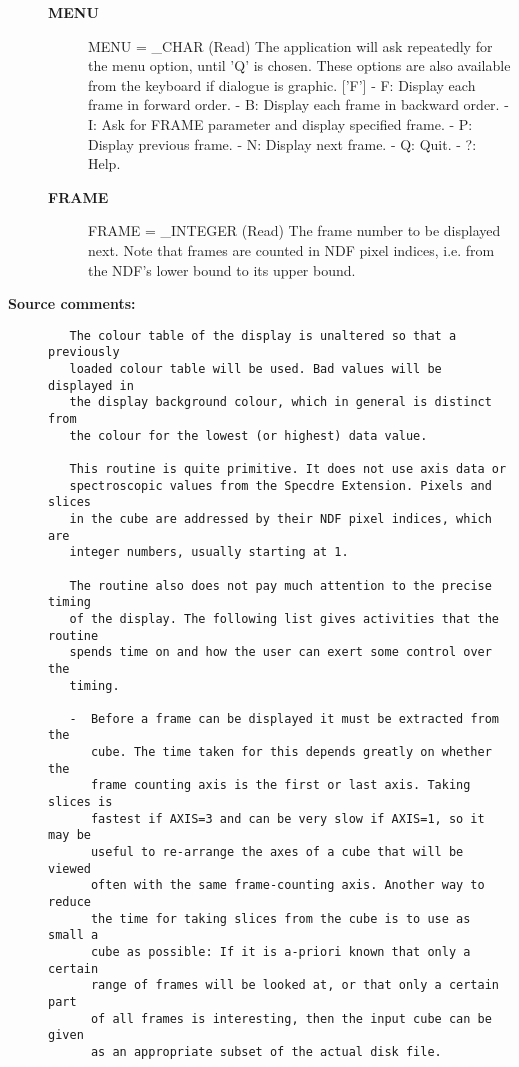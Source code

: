 \begin{description}
\begin{description}
\item [{\bf MENU}]
MENU = _CHAR (Read)
   The application will ask repeatedly for the menu option, until
   'Q' is chosen. These options are also available from the
   keyboard if dialogue is graphic. ['F']
   -  F: Display each frame in forward order.
   -  B: Display each frame in backward order.
   -  I: Ask for FRAME parameter and display specified frame.
   -  P: Display previous frame.
   -  N: Display next frame.
   -  Q: Quit.
   -  ?: Help.
\item [{\bf FRAME}]
FRAME = _INTEGER (Read)
   The frame number to be displayed next. Note that frames are
   counted in NDF pixel indices, i.e. from the NDF's lower bound
   to its upper bound.

\end{description}

\item [{\bf Source comments:}]
\begin{verbatim}
   The colour table of the display is unaltered so that a previously
   loaded colour table will be used. Bad values will be displayed in
   the display background colour, which in general is distinct from
   the colour for the lowest (or highest) data value.

   This routine is quite primitive. It does not use axis data or
   spectroscopic values from the Specdre Extension. Pixels and slices
   in the cube are addressed by their NDF pixel indices, which are
   integer numbers, usually starting at 1.

   The routine also does not pay much attention to the precise timing
   of the display. The following list gives activities that the routine
   spends time on and how the user can exert some control over the
   timing.

   -  Before a frame can be displayed it must be extracted from the
      cube. The time taken for this depends greatly on whether the
      frame counting axis is the first or last axis. Taking slices is
      fastest if AXIS=3 and can be very slow if AXIS=1, so it may be
      useful to re-arrange the axes of a cube that will be viewed
      often with the same frame-counting axis. Another way to reduce
      the time for taking slices from the cube is to use as small a
      cube as possible: If it is a-priori known that only a certain
      range of frames will be looked at, or that only a certain part
      of all frames is interesting, then the input cube can be given
      as an appropriate subset of the actual disk file.


\end{verbatim}
\end{description}
